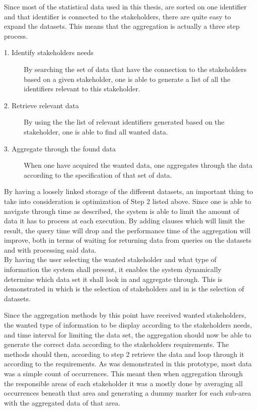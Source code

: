 Since most of the statistical data used in this thesis, are sorted on one 
identifier and that identifier is connected to the stakeholders, there are 
quite easy to expand the datasets. This means that the aggregation is actually
a three step process.

\begin{description}
	\item [1. Identify stakeholders needs] By searching the set of data that 
	have the connection to the stakeholders based on a given stakeholder, one 
	is able to generate a list of all the identifiers relevant to this 
	stakeholder.
	\item [2. Retrieve relevant data] By using the the list of relevant
	identifiers generated based on the stakeholder, one is able to find all 
	wanted data.
	\item [3. Aggregate through the found data] When one have acquired the 
	wanted data, one aggregates through the data according to the 
	specification of that set of data.
\end{description}


By having a loosely linked storage of the different datasets, an important
thing to take into consideration is optimization of Step 2 listed above. Since
one is able to navigate through time as described, the system is able to limit
the amount of data it has to process at each execution. By adding clauses which
will limit the result, the query time will drop and the performance time of the
aggregation will improve, both in terms of waiting for returning data from
queries on the datasets and with processing said data.\\

By having the user selecting the wanted stakeholder and what type of
information the system shall present, it enables the system dynamically
determine which data set it shall look in and aggregate through. This is
demonstrated in  which is the
selection of stakeholders and in  is 
the selection of datasets.

Since the aggregation methods by this point have received wanted stakeholders,
the wanted type of information to be display according to the stakeholders
needs, and time interval for limiting the data set, the aggregation should now
be able to generate the correct data according to the stakeholders
requirements. The methods should then, according to step 2 retrieve the data
and loop through it according to the requirements. As was demonstrated in this 
prototype, most data was a simple count of occurrences. This meant then when
aggregation through the responsible areas of each stakeholder it was a mostly
done by averaging all occurrences beneath that area and generating a dummy
marker for each sub-area with the aggregated data of that area.


